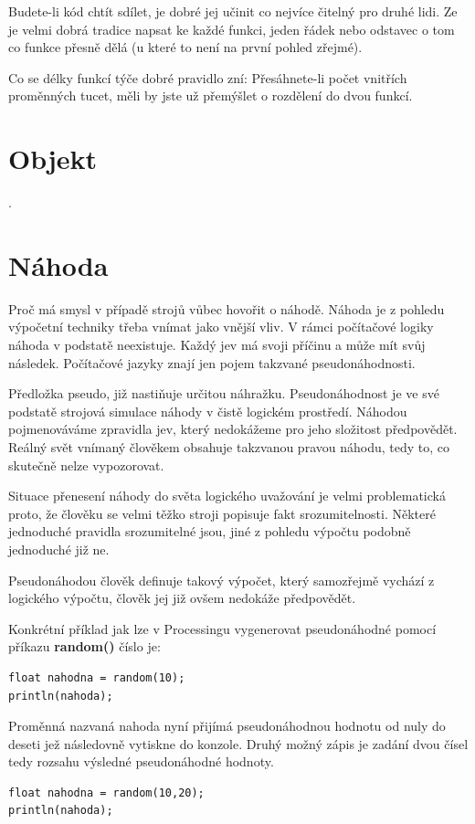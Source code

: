 \documentclass[10pt]{book}
\newcommand{\oddil}[1]{\section{#1}\index{#1}\label{#1}}
\newcommand{\slovnik}[1]{\textbf{\gls{#1}}\index{#1}\label{#1}}
\begin{document}
Budete-li kód chtít sdílet, je dobré jej učinit co nejvíce čitelný pro druhé lidi. Ze je velmi dobrá tradice napsat ke každé funkci, jeden řádek nebo odstavec o tom co funkce přesně dělá  (u které to není na první pohled zřejmé).

Co se délky funkcí týče dobré pravidlo zní: Přesáhnete-li počet vnitřích proměnných tucet, měli by jste už přemýšlet o rozdělení do dvou funkcí.


\oddil{Objekt}

.





\oddil{Náhoda}

Proč má smysl v případě strojů vůbec hovořit o náhodě. Náhoda je z pohledu výpočetní techniky třeba vnímat jako vnější vliv. V rámci počítačové logiky náhoda v podstatě neexistuje. Každý jev má svoji příčinu a může mít svůj následek. Počítačové jazyky znají jen pojem takzvané pseudonáhodnosti.

Předložka pseudo, již nastiňuje určitou náhražku. Pseudonáhodnost je ve své podstatě strojová simulace náhody v čistě logickém prostředí. Náhodou pojmenováváme zpravidla jev, který nedokážeme pro jeho složitost předpovědět. Reálný svět vnímaný člověkem obsahuje takzvanou pravou náhodu, tedy to, co skutečně nelze vypozorovat.

Situace přenesení náhody do světa logického uvažování je velmi problematická proto, že člověku se velmi těžko stroji popisuje fakt srozumitelnosti. Některé jednoduché pravidla srozumitelné jsou, jiné z pohledu výpočtu podobně jednoduché již ne.

Pseudonáhodou člověk definuje takový výpočet, který samozřejmě vychází z logického výpočtu, člověk jej již ovšem nedokáže předpovědět.

Konkrétní příklad jak lze v Processingu vygenerovat pseudonáhodné pomocí příkazu \slovnik{random()} číslo je:

\begin{lstlisting}
float nahodna = random(10);
println(nahoda);
\end{lstlisting}

Proměnná nazvaná nahoda nyní přijímá pseudonáhodnou hodnotu od nuly do deseti jež následovně vytiskne do konzole. Druhý možný zápis je zadání dvou čísel tedy rozsahu výsledné pseudonáhodné hodnoty.


\begin{lstlisting}
float nahodna = random(10,20);
println(nahoda);
\end{lstlisting}
\end{document}
